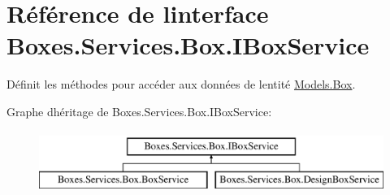 \hypertarget{interface_boxes_1_1_services_1_1_box_1_1_i_box_service}{}\section{Référence de l\textquotesingle{}interface Boxes.\+Services.\+Box.\+I\+Box\+Service}
\label{interface_boxes_1_1_services_1_1_box_1_1_i_box_service}


Définit les méthodes pour accéder aux données de l\textquotesingle{}entité \hyperlink{class_boxes_1_1_models_1_1_box}{Models.\+Box}.  


Graphe d\textquotesingle{}héritage de Boxes.\+Services.\+Box.\+I\+Box\+Service\+:\begin{figure}[H]
\begin{center}
\leavevmode
\includegraphics[height=2.000000cm]{interface_boxes_1_1_services_1_1_box_1_1_i_box_service}
\end{center}
\end{figure}
